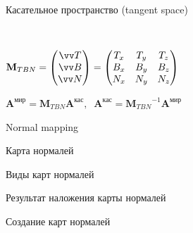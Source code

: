 \documentclass[10pt]{beamer}
\begin{document}
\begin{frame}{Касательное пространство (tangent space)}
{		~
		
		\pause$
		\mathbf M_{TBN}=
		\begin{pmatrix}
			\vv T\\
			\vv B\\
			\vv N\\
		\end{pmatrix}
		=
		\begin{pmatrix}
			T_x & T_y & T_z\\
			B_x & B_y & B_z\\
			N_x & N_y & N_z\\
		\end{pmatrix}
		$	
		
		$\mathbf A^\text{мир} = \mathbf M_{TBN} \mathbf A^\text{кас}, \ $
		$\mathbf A^\text{кас} = {\mathbf M _{TBN}}^{-1} \mathbf A^\text{мир}$
		
	}
	
	
	
\end{frame}	

\begin{frame}{Normal mapping}
		
		\centering
		
		

\end{frame}
	
\begin{frame}{Карта нормалей}
	
	\centering
	{
	}{
	}

	
\end{frame}
	
\begin{frame}{Виды карт нормалей}
	
	
\end{frame}

\begin{frame}{Результат наложения карты нормалей}
	{
	}{
	}
	
\end{frame}



\begin{frame}{Создание карт нормалей}	
	
	{
		
		
	}{
	}
	
\end{frame}
\end{document}
